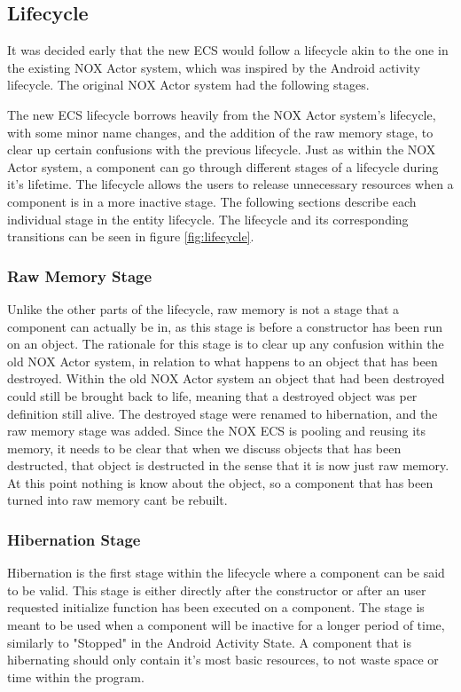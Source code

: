 \subsection{Lifecycle}
\label{subsec:high_level_lifecycle}
It was decided early that the new ECS would follow a lifecycle akin to the one in the existing NOX Actor system,
which was inspired by the Android activity lifecycle\cite{android_activity_lifecycle}.
The original NOX Actor system had the following stages.

The new ECS lifecycle borrows heavily from the NOX Actor system's lifecycle, with some minor name changes,
and the addition of the raw memory stage, to clear up certain confusions with the previous lifecycle.
Just as within the NOX Actor system, a component can go through different stages of a lifecycle during it's lifetime.
The lifecycle allows the users to release unnecessary resources when a component is in a more inactive stage.
The following sections describe each individual stage in the entity lifecycle.
The lifecycle and its corresponding transitions can be seen in figure \ref{fig:lifecycle}.

\subsubsection{Raw Memory Stage}
Unlike the other parts of the lifecycle, raw memory is not a stage that a component can actually be in,
as this stage is before a constructor has been run on an object.
The rationale for this stage is to clear up any confusion within the old NOX Actor system,
in relation to what happens to an object that has been destroyed.
Within the old NOX Actor system an object that had been destroyed could still be brought back to life,
meaning that a destroyed object was per definition still alive.
The destroyed stage were renamed to hibernation, and the raw memory stage was added.
Since the NOX ECS is pooling and reusing its memory, it needs to be clear that when we discuss objects
that has been destructed, that object is destructed in the sense that it is now just raw memory.
At this point nothing is know about the object, so a component that has been turned into raw memory cant be rebuilt.

\subsubsection{Hibernation Stage}
Hibernation is the first stage within the lifecycle where a component can be said to be valid.
This stage is either directly after the constructor or after an user requested initialize function has been executed on a component.
The stage is meant to be used when a component will be inactive for a longer period of time, similarly to "Stopped" in the Android Activity State\cite[Activity state and ejection from memory]{android_activity_lifecycle}.
A component that is hibernating should only contain it's most basic resources, to not waste space or time within the program.

